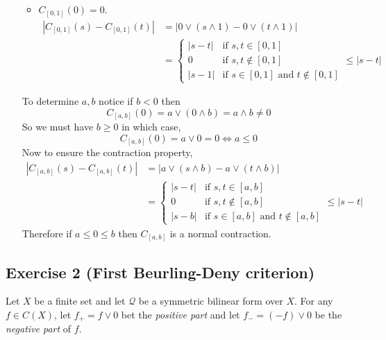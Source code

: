 \begin{itemize}
\begin{itemize}
\begin{equation*}
				\end{equation*}
			\item 
				$C_{[0,1]}(0) = 0$.\\
				\begin{equation*}
					\begin{aligned}
						|C_{[0,1]}(s) - C_{[0,1]}(t)| &= |0\vee(s\wedge 1) - 0\vee(t\wedge 1)|\\
						&=
						\begin{cases}
							|s - t| &\text{if }s,t\in[0,1]\\
							0 &\text{if }s,t\not\in[0,1]\\
							|s - 1| &\text{if }s\in[0,1]\text{ and }t\not\in[0,1]
						\end{cases} \leq |s - t|
					\end{aligned}
				\end{equation*}
		\end{itemize}
		To determine $a,b$ notice if $b<0$ then
		\begin{equation*}
			C_{[a,b]}(0) = a\vee(0\wedge b) = a\wedge b \neq 0
		\end{equation*}
		So we must have $b\geq 0$ in which case,
		\begin{equation*}
			C_{[a,b]}(0) = a\vee 0 = 0 \iff a\leq 0
		\end{equation*}
		Now to ensure the contraction property,
		\begin{equation*}
			\begin{aligned}
				|C_{[a,b]}(s) - C_{[a,b]}(t)| &= |a\vee(s\wedge b) - a\vee(t\wedge b)|\\
				&= 
				\begin{cases}
					|s - t| &\text{if }s,t\in[a,b]\\
					0 &\text{if }s,t\not\in[a,b]\\
					|s - b| &\text{if }s\in[a,b]\text{ and }t\not\in[a,b]
				\end{cases} \leq |s - t|
			\end{aligned}
		\end{equation*}
		Therefore if $a\leq 0\leq b$ then $C_{[a,b]}$ is a normal contraction.
\end{itemize}

\subsection{Exercise 2 (First Beurling-Deny criterion)}
Let $X$ be a finite set and let $\mathcal{Q}$ be a symmetric bilinear form over $X$. For any $f\in C(X)$, let $f_{+}=f\vee 0$ bet the \textit{positive part} and let $f_{-}=(-f)\vee 0$ be the \textit{negative part} of $f$.

